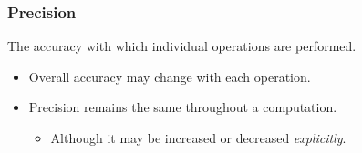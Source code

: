\begin{frame}

\frametitle{Precision}

\vspace{\fill}

\begin{center}

The accuracy with which individual operations are performed.

\end{center}

\vspace{\fill}

\begin{itemize}

\item Overall accuracy may change with each operation.

\item Precision remains the same throughout a computation.

\begin{itemize}

\item Although it may be increased or decreased \emph{explicitly}.

\end{itemize}

\end{itemize}

\vspace{\fill}

\end{frame}
